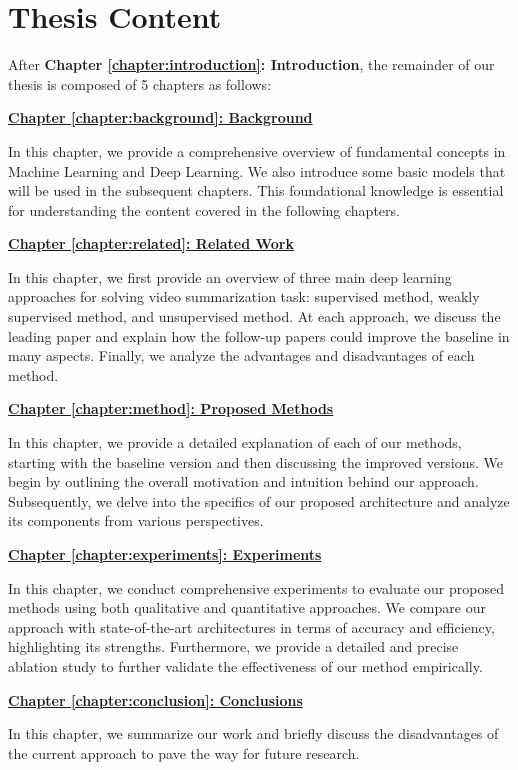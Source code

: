 \section{Thesis Content}
\label{section:intro-content}

    After \textbf{Chapter \ref{chapter:introduction}: Introduction}, the remainder of our thesis is composed of 5 chapters as follows:

    \hyperref[chapter:background]{\textbf{Chapter \ref{chapter:background}: Background}}

        In this chapter, we provide a comprehensive overview of fundamental concepts in Machine Learning and Deep Learning. We also introduce some basic models that will be used in the subsequent chapters. This foundational knowledge is essential for understanding the content covered in the following chapters.

    \hyperref[chapter:related]{\textbf{Chapter \ref{chapter:related}: Related Work}}

        In this chapter, we first provide an overview of three main deep learning approaches for solving video summarization task: supervised method, weakly supervised method, and unsupervised method. At each approach, we discuss the leading paper and explain how the follow-up papers could improve the baseline in many aspects. Finally, we analyze the advantages and disadvantages of each method. 

    \hyperref[chapter:method]{\textbf{Chapter \ref{chapter:method}: Proposed Methods}}

        In this chapter, we provide a detailed explanation of each of our methods, starting with the baseline version and then discussing the improved versions. We begin by outlining the overall motivation and intuition behind our approach. Subsequently, we delve into the specifics of our proposed architecture and analyze its components from various perspectives.

    \hyperref[chapter:experiments]{\textbf{Chapter \ref{chapter:experiments}: Experiments}}

        In this chapter, we conduct comprehensive experiments to evaluate our proposed methods using both qualitative and quantitative approaches. We compare our approach with state-of-the-art architectures in terms of accuracy and efficiency, highlighting its strengths. Furthermore, we provide a detailed and precise ablation study to further validate the effectiveness of our method empirically.

    \hyperref[chapter:conclusion]{\textbf{Chapter \ref{chapter:conclusion}: Conclusions}}

        In this chapter, we summarize our work and briefly discuss the disadvantages of the current approach to pave the way for future research.